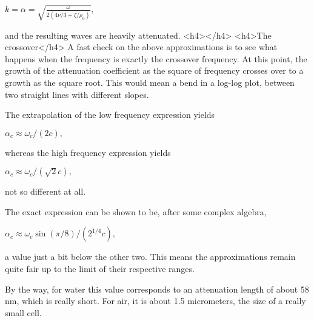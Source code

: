 $ k=\alpha =\sqrt{ \frac{\omega}{ 2(4\nu/3+\zeta/\rho_0)}},$

and the resulting waves are heavily attenuated.
<h4></h4>
<h4>The crossover</h4>
A fast check on the above approximations is to see what happens when the frequency is exactly the crossover frequency. At this point, the growth of the attenuation coefficient as the square of frequency crosses over to a growth as the square root. This would mean a bend in a log-log plot, between two straight lines with different slopes.

The extrapolation of the low frequency expression yields

$ \alpha_c\approx \omega_c/(2 c) , $

whereas the high frequency expression yields

$ \alpha_c\approx \omega_c/(\sqrt{2} c) , $

not so different at all.

The exact expression can be shown to be, after some complex algebra,

$ \alpha_c\approx \omega_c \sin(\pi/8) / (2^{1/4} c) , $

a value just a bit below the other two. This means the approximations remain quite fair up to the limit of their respective ranges.

By the way, for water this value corresponds to an attenuation length of about 58 nm, which is really short. For air, it is about 1.5 micrometers, the size of a really small cell.

 

 